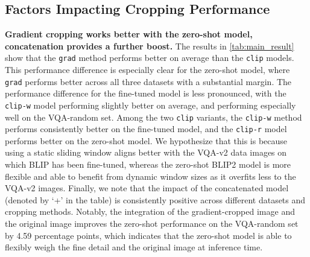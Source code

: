 





\subsection{Factors Impacting Cropping Performance}
\label{5.2}


\textbf{Gradient cropping works better with the zero-shot model, concatenation provides a further boost.} The results in \autoref{tab:main_result} show that the \texttt{grad} method performs better on average than the \texttt{clip} models. 
This performance difference is especially clear for the zero-shot model, where \texttt{grad} performs better across all three datasets with a substantial margin. The performance difference for the fine-tuned model is less pronounced, with the \texttt{clip-w} model performing slightly better on average, and performing especially well on the VQA-random set. Among the two \texttt{clip} variants, the \texttt{clip-w} method performs consistently better on the fine-tuned model, and the \texttt{clip-r} model performs better on the zero-shot model. We hypothesize that this is because using a static sliding window aligns better with the VQA-v2 data images on which BLIP has been fine-tuned, whereas the zero-shot BLIP2 model is more flexible and able to benefit from dynamic window sizes as it overfits less to the VQA-v2 images. Finally, we note that the impact of the concatenated model (denoted by `+' in the table) is consistently positive across different datasets and cropping methods. Notably, the integration of the gradient-cropped image and the original image improves the zero-shot performance on the VQA-random set by 4.59 percentage points, which indicates that the zero-shot model is able to flexibly weigh the fine detail and the original image at inference time.


